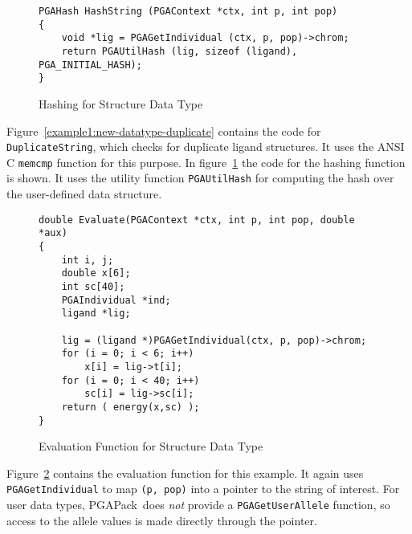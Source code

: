 \documentclass{report}
\newcommand{\pga}{PGAPack}
\begin{document}
\begin{figure}
\begin{verbatim}
PGAHash HashString (PGAContext *ctx, int p, int pop)
{
    void *lig = PGAGetIndividual (ctx, p, pop)->chrom;
    return PGAUtilHash (lig, sizeof (ligand), PGA_INITIAL_HASH);
}

\end{verbatim}
\caption{Hashing for Structure Data Type}
\label{example1:new-datatype-hash}
\end{figure}

Figure~\ref{example1:new-datatype-duplicate} contains the code for
\verb+DuplicateString+, which checks for duplicate ligand structures.
It uses the ANSI C \verb+memcmp+ function for this purpose. In
figure~\ref{example1:new-datatype-hash} the code for the hashing
function is shown. It uses the utility function \verb+PGAUtilHash+ for
computing the hash over the user-defined data structure.

\begin{figure}
\begin{verbatim}
double Evaluate(PGAContext *ctx, int p, int pop, double *aux)
{
    int i, j;
    double x[6];
    int sc[40];
    PGAIndividual *ind;
    ligand *lig;

    lig = (ligand *)PGAGetIndividual(ctx, p, pop)->chrom;
    for (i = 0; i < 6; i++)
        x[i] = lig->t[i];
    for (i = 0; i < 40; i++)
        sc[i] = lig->sc[i];
    return ( energy(x,sc) );
}
\end{verbatim}
\caption{Evaluation Function for Structure Data Type}
\label{example1:new-datatype-evaluate}
\end{figure}

Figure~\ref{example1:new-datatype-evaluate} contains the evaluation function
for this example.  It again uses \verb+PGAGetIndividual+ to map \verb+(p, pop)+
into a pointer to the string of interest.  For user data types, \pga\ does
{\em not} provide a \verb+PGAGetUserAllele+ function, so access to the allele
values is made directly through the pointer.
\end{document}
